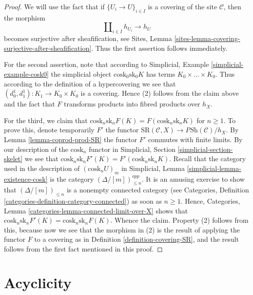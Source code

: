 \begin{proof}
We will use the fact that if
$\{U_i \to U\}_{i \in I}$ is a covering of the site
$\mathcal{C}$, then the morphism
$$
\amalg_{i \in I} h_{U_i} \to h_U
$$
becomes surjective after sheafification, see
Sites, Lemma \ref{sites-lemma-covering-surjective-after-sheafification}.
Thus the first assertion follows immediately.

\medskip\noindent
For the second assertion, note that according to
Simplicial, Example \ref{simplicial-example-cosk0}
the simplicial object $\text{cosk}_0 \text{sk}_0 K$
has terms $K_0 \times \ldots \times K_0$. Thus
according to the definition of a hypercovering we
see that $(d^1_0, d^1_1) : K_1 \to K_0 \times K_0$ is a
covering. Hence (2) follows from the claim above
and the fact that $F$ transforms products into fibred
products over $h_X$.

\medskip\noindent
For the third, we claim that
$\text{cosk}_n \text{sk}_n F(K) =
F(\text{cosk}_n \text{sk}_n K)$ for $n \geq 1$.
To prove this, denote temporarily $F'$ the functor
$\text{SR}(\mathcal{C}, X) \to \textit{PSh}(\mathcal{C})/h_X$.
By Lemma \ref{lemma-coprod-prod-SR} the functor
$F'$ commutes with finite limits.
By our description of the $\text{cosk}_n$ functor in
Simplicial, Section \ref{simplicial-section-skelet}
we see that $\text{cosk}_n \text{sk}_n F'(K) =
F'(\text{cosk}_n \text{sk}_n K)$.
Recall that the category used in the description of
$(\text{cosk}_n U)_m$ in
Simplicial, Lemma \ref{simplicial-lemma-existence-cosk}
is the category $(\Delta/[m])^{opp}_{\leq n}$. It is an
amusing exercise to show that $(\Delta/[m])_{\leq n}$ is
a nonempty connected category (see
Categories, Definition \ref{categories-definition-category-connected})
as soon as $n \geq 1$. Hence,
Categories, Lemma \ref{categories-lemma-connected-limit-over-X}
shows that $\text{cosk}_n \text{sk}_n F'(K) =
\text{cosk}_n \text{sk}_n F(K)$. Whence the claim.
Property (2) follows from this, because now we see that
the morphism in (2) is the result of applying the
functor $F$ to a covering as in Definition \ref{definition-covering-SR},
and the result follows from the first fact mentioned
in this proof.
\end{proof}



\section{Acyclicity}
\label{section-acyclicity}

